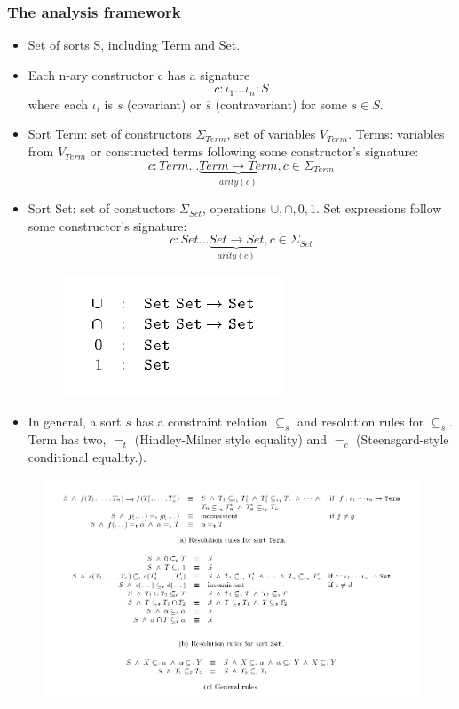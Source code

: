 \documentclass{beamer}
\begin{document}
\begin{frame}[allowframebreaks]
  \frametitle {The analysis framework}
  \begin{itemize}
    \item Set of sorts S, including Term and Set.
    \item Each n-ary constructor c has a signature $$ c: \iota_1
      \dotso \iota_n : S $$
      where each $\iota_i$ is $s$ (covariant) or $\overline{s}$
      (contravariant) for some $s \in S$.
    \item Sort Term: set of constructors $\Sigma_{Term}$, 
      set of variables $V_{Term}$. Terms: variables from $V_{Term}$ or
      constructed terms following some constructor's signature:
      $$ c:Term \dotso \underbrace{Term \rightarrow Term}_{arity(c)},
      c \in \Sigma_{Term} $$
    \item Sort Set: set of constuctors $\Sigma_{Set}$, operations
      ${\cup, \cap, 0, 1}$. Set expressions follow some constructor's
      signature: 
      $$ c:Set \dotso \underbrace{Set \rightarrow Set}_{arity(c)},
      c \in \Sigma_{Set} $$
      \begin{figure}
        \centering
        \includegraphics[scale=0.3]{set_operations.png}
      \end{figure}
    \item In general, a sort $s$ has a constraint relation
      $\subseteq_s$ and resolution rules for $\subseteq_s$. Term has
      two, $=_t$ (Hindley-Milner style equality) and $=_c$
      (Steensgard-style conditional equality.).
  \end{itemize}

  \begin{figure}
    \centering
    \includegraphics[scale=0.3]{resolution_rules.png}
  \end{figure}

\end{frame}
\end{document}
